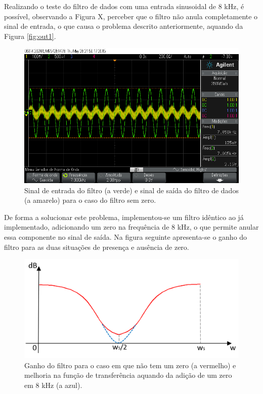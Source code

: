 \documentclass[11pt]{article}
\numberwithin{equation}{section}
\begin{document}
Realizando o teste do filtro de dados com uma entrada sinusoidal de 8 kHz, é possível, observando a Figura X, perceber que o filtro não anula completamente o sinal de entrada, o que causa o problema descrito anteriormente, aquando da Figura \ref{fig:out1}.

\begin{figure}[H]
	\centering
	\includegraphics[keepaspectratio=true, scale=0.37]{exps/FiltroSemZero8k}
	\caption{Sinal de entrada do filtro (a verde) e sinal de saída do filtro de dados (a amarelo) para o caso do filtro sem zero.}
	\vspace{-0.8em}
\end{figure} 

De forma a solucionar este problema, implementou-se um filtro idêntico ao já implementado, adicionando um zero na frequência de 8 kHz, o que permite anular essa componente no sinal de saída. Na figura seguinte apresenta-se o ganho do filtro para as duas situações de presença e ausência de zero.

\begin{figure}[H]
	\centering
	\includegraphics[keepaspectratio=true, scale=0.30]{teoricas/filtro1}
	\caption{Ganho do filtro para o caso em que não tem um zero (a vermelho) e melhoria na função de transferência aquando da adição de um zero em 8 kHz (a azul).}
	\vspace{-0.8em}
\end{figure} 
\end{document}
